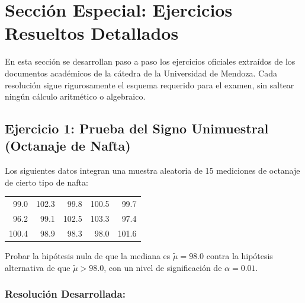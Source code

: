 \documentclass[11pt,a4paper]{article}
\begin{document}
\newpage
\section{Sección Especial: Ejercicios Resueltos Detallados}

En esta sección se desarrollan paso a paso los ejercicios oficiales extraídos de los documentos académicos de la cátedra de la Universidad de Mendoza. Cada resolución sigue rigurosamente el esquema requerido para el examen, sin saltear ningún cálculo aritmético o algebraico.

\subsection{Ejercicio 1: Prueba del Signo Unimuestral (Octanaje de Nafta)} \label{ej:signo_uni}

\begin{tcolorbox}[colback=white,colframe=blue!60!black,title=Enunciado]
    Los siguientes datos integran una muestra aleatoria de 15 mediciones de octanaje de cierto tipo de nafta:
    \begin{center}
    \small
    \begin{tabular}{rrrrr}
    99.0 & 102.3 & 99.8 & 100.5 & 99.7 \\
    96.2 & 99.1 & 102.5 & 103.3 & 97.4 \\
    100.4 & 98.9 & 98.3 & 98.0 & 101.6
    \end{tabular}
    \end{center}
    Probar la hipótesis nula de que la mediana es $\tilde{\mu} = 98.0$ contra la hipótesis alternativa de que $\tilde{\mu} > 98.0$, con un nivel de significación de $\alpha = 0.01$.
\end{tcolorbox}

\subsubsection*{Resolución Desarrollada:}
\end{document}
